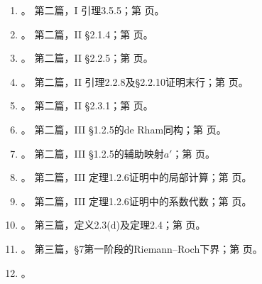 \begin{enumerate}[label=\arabic*.,leftmargin=2.5em,itemsep=7pt]
第二篇，I §3.3.5；第\,\pageref*{translator-note:9}\,页。
\item \hypertarget{translator-index-10}{}\hyperlink{translator-note-10}{}。
第二篇，I 引理3.5.5；第\,\pageref*{translator-note:10}\,页。
\item \hypertarget{translator-index-11}{}\hyperlink{translator-note-11}{}。
第二篇，II §2.1.4；第\,\pageref*{translator-note:11}\,页。
\item \hypertarget{translator-index-12}{}\hyperlink{translator-note-12}{}。
第二篇，II §2.2.5；第\,\pageref*{translator-note:12}\,页。
\item \hypertarget{translator-index-13}{}\hyperlink{translator-note-13}{}。
第二篇，II 引理2.2.8及§2.2.10证明末行；第\,\pageref*{translator-note:13}\,页。
\item \hypertarget{translator-index-14}{}\hyperlink{translator-note-14}{}。
第二篇，II §2.3.1；第\,\pageref*{translator-note:14}\,页。
\item \hypertarget{translator-index-15}{}\hyperlink{translator-note-15}{}。
第二篇，III §1.2.5的de Rham同构；第\,\pageref*{translator-note:15}\,页。
\item \hypertarget{translator-index-16}{}\hyperlink{translator-note-16}{}。
第二篇，III §1.2.5的辅助映射$a'$；第\,\pageref*{translator-note:16}\,页。
\item \hypertarget{translator-index-17}{}\hyperlink{translator-note-17}{}。
第二篇，III 定理1.2.6证明中的局部计算；第\,\pageref*{translator-note:17}\,页。
\item \hypertarget{translator-index-18}{}\hyperlink{translator-note-18}{}。
第二篇，III 定理1.2.6证明中的系数代数；第\,\pageref*{translator-note:18}\,页。
\item \hypertarget{translator-index-19}{}\hyperlink{translator-note-19}{}。
第三篇，定义2.3(d)及定理2.4；第\,\pageref*{translator-note:19}\,页。
\item \hypertarget{translator-index-20}{}\hyperlink{translator-note-20}{}。
第三篇，§7第一阶段的Riemann--Roch下界；第\,\pageref*{translator-note:20}\,页。
\item \hypertarget{translator-index-21}{}\hyperlink{translator-note-21}{}。

\end{enumerate}
